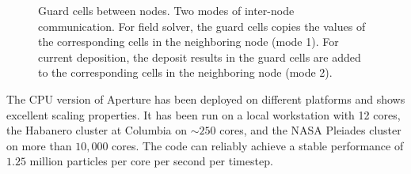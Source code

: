 \begin{figure}[h]
  \centering
  \caption[Guard cells between nodes.]{Guard cells between nodes. Two modes of
    inter-node communication. For field solver, the guard cells copies the values
  of the corresponding cells in the neighboring node (mode 1). For current
  deposition, the deposit results in the guard cells are added to the
  corresponding cells in the neighboring node (mode 2).}
  \label{fig:guard-cells}
\end{figure}

The CPU version of Aperture has been deployed on different platforms and shows
excellent scaling properties. It has been run on a local workstation with 12
cores, the Habanero cluster at Columbia on $\sim 250$ cores, and the NASA
Pleiades cluster on more than $10,000$ cores. The code can reliably achieve a
stable performance of $1.25$ million particles per core per second per timestep.





